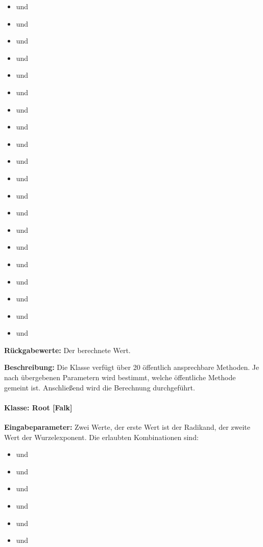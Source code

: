 \begin{itemize}
\item {} und 
\item {} und 
\item {} und 
\item {} und 
\item {} und 
\item {} und 
\item {} und 
\item {} und 
\item {} und 
\item {} und 
\item {} und 
\item {} und 
\item {} und 
\item {} und 
\item {} und 
\item {} und 
\item {} und 
\item {} und 
\item {} und  
\item {} und 
\end{itemize}

\textbf{Rückgabewerte: }Der berechnete Wert. 

\textbf{Beschreibung: }Die Klasse verfügt über 20 öffentlich ansprechbare Methoden. Je nach übergebenen Parametern wird bestimmt, welche öffentliche Methode gemeint ist. Anschließend wird die Berechnung durchgeführt. 

\paragraph{Klasse: Root [Falk]}

\textbf{Eingabeparameter: }Zwei Werte, der erste Wert ist der Radikand, der zweite Wert der Wurzelexponent. Die erlaubten Kombinationen sind: 

\begin{itemize}
\item {} und 
\item {} und 
\item {} und  
\item {} und 
\item {} und 
\item {} und 
\end{itemize}

